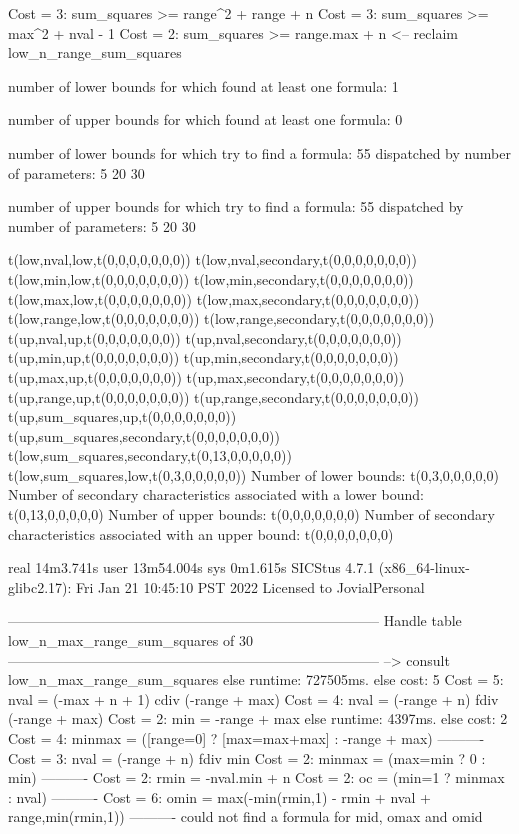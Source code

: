 Cost =  3:  sum_squares >= range^2 + range + n
Cost =  3:  sum_squares >= max^2 + nval - 1
Cost =  2:  sum_squares >= range.max + n
<-- reclaim low_n_range_sum_squares

number of lower bounds for which found at least one formula: 1

number of upper bounds for which found at least one formula: 0

number of lower bounds for which try to find a formula: 55
dispatched by number of parameters: 5  20  30

number of upper bounds for which try to find a formula: 55
dispatched by number of parameters: 5  20  30

t(low,nval,low,t(0,0,0,0,0,0,0))
t(low,nval,secondary,t(0,0,0,0,0,0,0))
t(low,min,low,t(0,0,0,0,0,0,0))
t(low,min,secondary,t(0,0,0,0,0,0,0))
t(low,max,low,t(0,0,0,0,0,0,0))
t(low,max,secondary,t(0,0,0,0,0,0,0))
t(low,range,low,t(0,0,0,0,0,0,0))
t(low,range,secondary,t(0,0,0,0,0,0,0))
t(up,nval,up,t(0,0,0,0,0,0,0))
t(up,nval,secondary,t(0,0,0,0,0,0,0))
t(up,min,up,t(0,0,0,0,0,0,0))
t(up,min,secondary,t(0,0,0,0,0,0,0))
t(up,max,up,t(0,0,0,0,0,0,0))
t(up,max,secondary,t(0,0,0,0,0,0,0))
t(up,range,up,t(0,0,0,0,0,0,0))
t(up,range,secondary,t(0,0,0,0,0,0,0))
t(up,sum_squares,up,t(0,0,0,0,0,0,0))
t(up,sum_squares,secondary,t(0,0,0,0,0,0,0))
t(low,sum_squares,secondary,t(0,13,0,0,0,0,0))
t(low,sum_squares,low,t(0,3,0,0,0,0,0))
Number of lower bounds:                                             t(0,3,0,0,0,0,0)
Number of secondary characteristics associated with a lower bound:  t(0,13,0,0,0,0,0)
Number of upper bounds:                                             t(0,0,0,0,0,0,0)
Number of secondary characteristics associated with an upper bound: t(0,0,0,0,0,0,0)

real	14m3.741s
user	13m54.004s
sys	0m1.615s
SICStus 4.7.1 (x86_64-linux-glibc2.17): Fri Jan 21 10:45:10 PST 2022
Licensed to JovialPersonal


--------------------------------------------------------------------------------
Handle table low_n_max_range_sum_squares of 30
--------------------------------------------------------------------------------
--> consult low_n_max_range_sum_squares
else runtime: 727505ms. else cost: 5
Cost =  5:  nval   = (-max + n + 1) cdiv (-range + max) %
Cost =  4:  nval   = (-range + n) fdiv (-range + max)
Cost =  2:  min    = -range + max
else runtime: 4397ms. else cost: 2
Cost =  4:  minmax = ([range=0] ? [max=max+max] : -range + max) %
----------
Cost =  3:  nval   = (-range + n) fdiv min %
Cost =  2:  minmax = (max=min ? 0 : min)
----------
Cost =  2:  rmin   = -nval.min + n
Cost =  2:  oc     = (min=1 ? minmax : nval)
----------
Cost =  6:  omin   = max(-min(rmin,1) - rmin + nval + range,min(rmin,1))
----------
could not find a formula for mid, omax and omid

